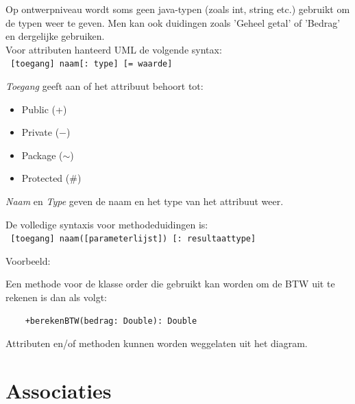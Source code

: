 \documentclass{article}
\begin{document}
	Op ontwerpniveau wordt soms geen java-typen (zoals int, string etc.) gebruikt om de typen weer te geven. Men kan ook duidingen zoals 'Geheel getal' of 'Bedrag' en dergelijke gebruiken. \\
	
	Voor attributen hanteerd UML de volgende syntax: \\
	
	\texttt{
	[toegang] naam[: type] [= waarde]
	} \\

\smallskip
	
	\noindent \textit{Toegang} geeft aan of het attribuut behoort tot: \\
	\begin{itemize}
		\item Public	(+)
		\item Private	($-$)
		\item Package	($\sim$)
		\item Protected (\#)
	\end{itemize}
	
	\noindent \textit{Naam} en \textit{Type} geven de naam en het type van het attribuut weer.
	
	\noindent De volledige syntaxis voor methodeduidingen is: \\
	
	\texttt{
	[toegang] naam([parameterlijst]) [: resultaattype]
	} \\

	\smallskip
	

	Voorbeeld: \\
	
	\smallskip
	
	\noindent Een methode voor de klasse order die gebruikt kan worden om de BTW uit te rekenen is dan als volgt: \\

	\begin{verbatim}
	+berekenBTW(bedrag: Double): Double
	\end{verbatim}
	
	Attributen en/of methoden kunnen worden weggelaten uit het diagram. \\
	\newpage
	
	\section{Associaties}
	
\end{document}

